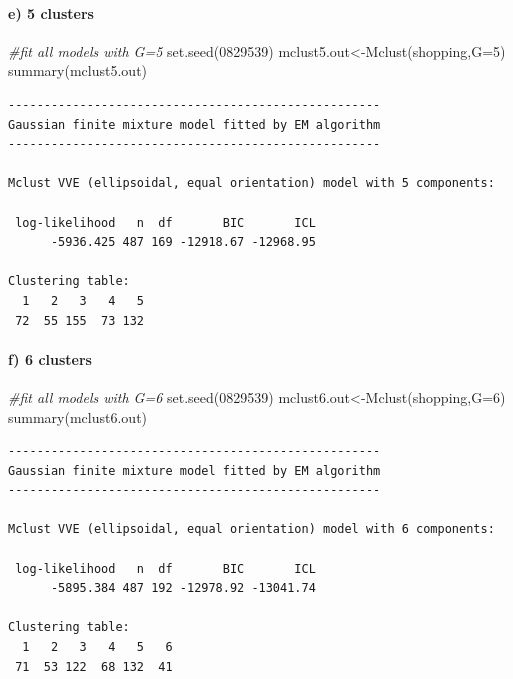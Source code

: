 \documentclass[
  11pt,
]{article}
\newenvironment{Shaded}{\begin{snugshade}}{\end{snugshade}}
\newcommand{\AttributeTok}[1]{\textcolor[rgb]{0.77,0.63,0.00}{#1}}
\newcommand{\CommentTok}[1]{\textcolor[rgb]{0.56,0.35,0.01}{\textit{#1}}}
\newcommand{\DecValTok}[1]{\textcolor[rgb]{0.00,0.00,0.81}{#1}}
\newcommand{\FunctionTok}[1]{\textcolor[rgb]{0.00,0.00,0.00}{#1}}
\newcommand{\NormalTok}[1]{#1}
\newcommand{\OtherTok}[1]{\textcolor[rgb]{0.56,0.35,0.01}{#1}}
\begin{document}
\hypertarget{e-5-clusters-1}{%
\paragraph{e) 5 clusters}\label{e-5-clusters-1}}

\begin{Shaded}
\begin{Highlighting}[]
\CommentTok{\#fit all models with G=5}
\FunctionTok{set.seed}\NormalTok{(}\DecValTok{0829539}\NormalTok{)}
\NormalTok{mclust5.out}\OtherTok{\textless{}{-}}\FunctionTok{Mclust}\NormalTok{(shopping,}\AttributeTok{G=}\DecValTok{5}\NormalTok{)}
\FunctionTok{summary}\NormalTok{(mclust5.out)}
\end{Highlighting}
\end{Shaded}

\begin{verbatim}
---------------------------------------------------- 
Gaussian finite mixture model fitted by EM algorithm 
---------------------------------------------------- 

Mclust VVE (ellipsoidal, equal orientation) model with 5 components: 

 log-likelihood   n  df       BIC       ICL
      -5936.425 487 169 -12918.67 -12968.95

Clustering table:
  1   2   3   4   5 
 72  55 155  73 132 
\end{verbatim}

\hypertarget{f-6-clusters-1}{%
\paragraph{f) 6 clusters}\label{f-6-clusters-1}}

\begin{Shaded}
\begin{Highlighting}[]
\CommentTok{\#fit all models with G=6}
\FunctionTok{set.seed}\NormalTok{(}\DecValTok{0829539}\NormalTok{)}
\NormalTok{mclust6.out}\OtherTok{\textless{}{-}}\FunctionTok{Mclust}\NormalTok{(shopping,}\AttributeTok{G=}\DecValTok{6}\NormalTok{)}
\FunctionTok{summary}\NormalTok{(mclust6.out)}
\end{Highlighting}
\end{Shaded}

\begin{verbatim}
---------------------------------------------------- 
Gaussian finite mixture model fitted by EM algorithm 
---------------------------------------------------- 

Mclust VVE (ellipsoidal, equal orientation) model with 6 components: 

 log-likelihood   n  df       BIC       ICL
      -5895.384 487 192 -12978.92 -13041.74

Clustering table:
  1   2   3   4   5   6 
 71  53 122  68 132  41 
\end{verbatim}
\end{document}
